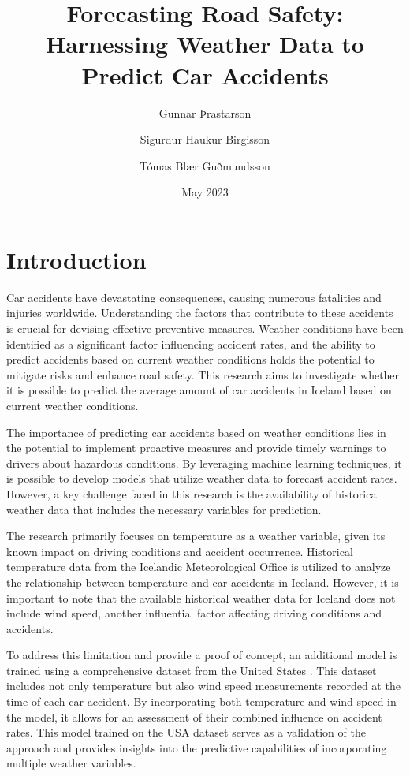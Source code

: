 \documentclass{article}
\title{Forecasting Road Safety: Harnessing Weather Data to Predict Car Accidents}
\author{
  Gunnar Þrastarson \and Sigurdur Haukur Birgisson \and Tómas Blær Guðmundsson 
}
\date{May 2023}
\begin{document}
\maketitle
\tableofcontents

\section{Introduction}

Car accidents have devastating consequences, causing numerous fatalities and injuries worldwide. Understanding the factors that contribute to these accidents is crucial for devising effective preventive measures. Weather conditions have been identified as a significant factor influencing accident rates, and the ability to predict accidents based on current weather conditions holds the potential to mitigate risks and enhance road safety. This research aims to investigate whether it is possible to predict the average amount of car accidents in Iceland based on current weather conditions.

The importance of predicting car accidents based on weather conditions lies in the potential to implement proactive measures and provide timely warnings to drivers about hazardous conditions. By leveraging machine learning techniques, it is possible to develop models that utilize weather data to forecast accident rates. However, a key challenge faced in this research is the availability of historical weather data that includes the necessary variables for prediction.

The research primarily focuses on temperature as a weather variable, given its known impact on driving conditions and accident occurrence. Historical temperature data from the Icelandic Meteorological Office \cite{isl_weather_data} is utilized to analyze the relationship between temperature and car accidents in Iceland. However, it is important to note that the available historical weather data for Iceland does not include wind speed, another influential factor affecting driving conditions and accidents.

To address this limitation and provide a proof of concept, an additional model is trained using a comprehensive dataset from the United States \cite{usa_data}. This dataset includes not only temperature but also wind speed measurements recorded at the time of each car accident. By incorporating both temperature and wind speed in the model, it allows for an assessment of their combined influence on accident rates. This model trained on the USA dataset serves as a validation of the approach and provides insights into the predictive capabilities of incorporating multiple weather variables.
\end{document}
